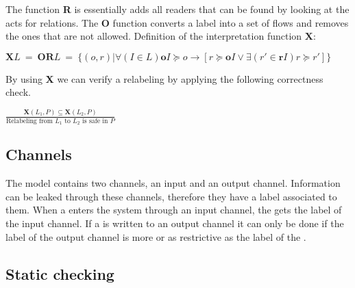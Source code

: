 The function \textbf{R} is essentially adds all readers that can be found by looking at the acts for relations.
The \textbf{O} function converts a label into a set of flows and removes the ones that are not allowed.
Definition of the interpretation function $\textbf{X}$:
\begin{definition}
  $\textbf{X}L \ = \ \textbf{OR}L \ = \ \{(o,r)|\forall (I \in L) \textbf{o}I \succeq o \rightarrow [r \succeq \textbf{o}I \vee \exists (r' \in \textbf{r}I) r \succeq r'] \}$
\end{definition}

By using \textbf{X} we can verify a relabeling by applying the following correctness check.
\begin{definition}
  $\frac{\textbf{X}(L_1, P)\subseteq \textbf{X}(L_2,P)}{\text{Relabeling from } L_1 \text{ to } L_2 \text{ is safe in } P }$
\end{definition}

\subsection{Channels}
The model contains two channels, an input and an output channel.
Information can be leaked through these channels, therefore they have a label associated to them.
When a \xvalue{} enters the system through an input channel, the \xvalue{} gets the label of the input channel.
If a \xvalue{} is written to an output channel it can only be done if the label of the output channel is more or as restrictive as the label of the \xvalue{}.

\subsection{Static checking}
